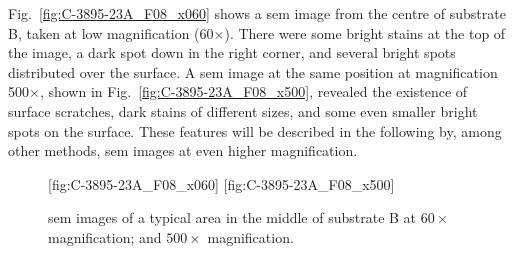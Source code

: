 


Fig.~\ref{fig:C-3895-23A_F08_x060} shows a \ac{sem} image from the centre of substrate B, taken at low magnification (60$\times$). There were some bright stains at the top of the image, a dark spot down in the right corner, and several bright spots distributed over the surface. A \ac{sem} image at the same position at magnification 500$\times$, shown in Fig.~\ref{fig:C-3895-23A_F08_x500}, revealed the existence of surface scratches, dark stains of different sizes, and some even smaller bright spots on the surface. These features will be described in the following by, among other methods, \ac{sem} images at even higher magnification.

\begin{figure}[htbp]
    \centering
    [fig:C-3895-23A_F08_x060]
    \hfill
    [fig:C-3895-23A_F08_x500]
    \caption[\Ac{sem} images of a typical area in the middle of substrate B.]{\Ac{sem} images of a typical area in the middle of substrate B at  $60\times$ magnification; and  $500\times$ magnification.}
    \label{fig:SEM_C389523_overview}
\end{figure}

